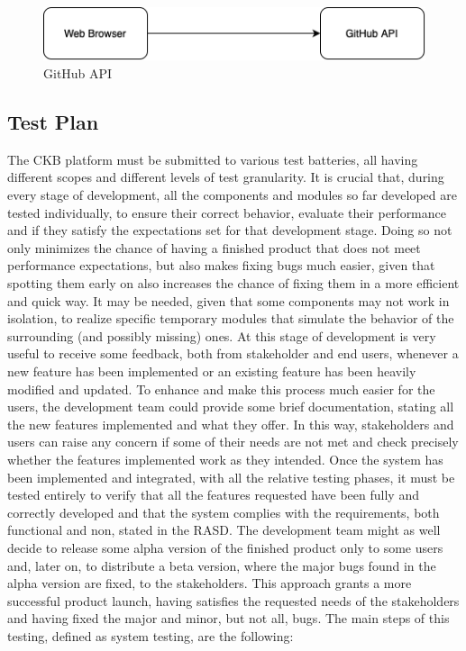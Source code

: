 \documentclass[12pt,oneside,a4paper]{article}
\begin{document}
\begin{figure}[htbp]
    \centering
    \includegraphics[scale=0.55]{Images/Diagrams/GitHub.png}
    \caption{GitHub API}
    \label{fig:enter-label}
\end{figure}

\subsection{Test Plan}
The CKB platform must be submitted to various test batteries, all having different scopes and different levels of test granularity. It is crucial that, during every stage of development, all the components and modules so far developed are tested individually, to ensure their correct behavior, evaluate their performance and if they satisfy the expectations set for that development stage. Doing so not only minimizes the chance of having a finished product that does not meet performance expectations, but also makes fixing bugs much easier, given that spotting them early on also increases the chance of fixing them in a more efficient and quick way. It may be needed, given that some components may not work in isolation, to realize specific temporary modules that simulate the behavior of the surrounding (and possibly missing) ones. At this stage of development is very useful to receive some feedback, both from stakeholder and end users, whenever a new feature has been implemented or an existing feature has been heavily modified and updated. To enhance and make this process much easier for the users, the development team could provide some brief documentation, stating all the new features implemented and what they offer. In this way, stakeholders and users can raise any concern if some of their needs are not met and check precisely whether the features implemented work as they intended. 
Once the system has been implemented and integrated, with all the relative testing phases, it must be tested entirely to verify that all the features requested have been fully and correctly developed and that the system complies with the requirements, both functional and non, stated in the RASD.
The development team might as well decide to release some alpha version of the finished product only to some users and, later on, to distribute a beta version, where the major bugs found in the alpha version are fixed, to the stakeholders. This approach grants a more successful product launch, having satisfies the requested needs of the stakeholders and having fixed the major and minor, but not all, bugs. The main steps of this testing, defined as system testing, are the following:
\end{document}

